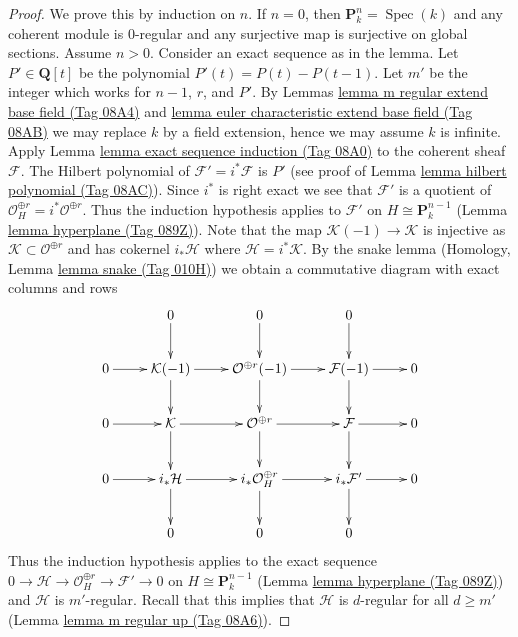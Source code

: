 \documentclass{amsart}
\theoremstyle{plain}
\theoremstyle{definition}
\theoremstyle{remark}
\numberwithin{equation}{subsection}
\def\Spec{\mathop{\mathrm{Spec}}}
\begin{document}
\begin{proof}
We prove this by induction on $n$. If $n = 0$, then
$\mathbf{P}^n_k = \Spec(k)$ and any coherent module is $0$-regular
and any surjective map is surjective on global sections.
Assume $n > 0$. Consider an exact sequence as in the lemma.
Let $P' \in \mathbf{Q}[t]$ be the polynomial
$P'(t) = P(t) - P(t - 1)$. Let $m'$ be the integer
which works for $n - 1$, $r$, and $P'$.
By Lemmas \href{https://stacks.math.columbia.edu/tag/08A4}{lemma m regular extend base field (Tag 08A4)} and
\href{https://stacks.math.columbia.edu/tag/08AB}{lemma euler characteristic extend base field (Tag 08AB)}
we may replace $k$ by a field extension, hence we may assume
$k$ is infinite. Apply 
Lemma \href{https://stacks.math.columbia.edu/tag/08A0}{lemma exact sequence induction (Tag 08A0)}
to the coherent sheaf $\mathcal{F}$.
The Hilbert polynomial of $\mathcal{F}' = i^*\mathcal{F}$
is $P'$ (see proof of Lemma \href{https://stacks.math.columbia.edu/tag/08AC}{lemma hilbert polynomial (Tag 08AC)}).
Since $i^*$ is right exact we see that $\mathcal{F}'$ is
a quotient of $\mathcal{O}_H^{\oplus r} = i^*\mathcal{O}^{\oplus r}$.
Thus the induction hypothesis applies to $\mathcal{F}'$ on
$H \cong \mathbf{P}^{n - 1}_k$ (Lemma \href{https://stacks.math.columbia.edu/tag/089Z}{lemma hyperplane (Tag 089Z)}).
Note that the map $\mathcal{K}(-1) \to \mathcal{K}$ is injective
as $\mathcal{K} \subset \mathcal{O}^{\oplus r}$ and has
cokernel $i_*\mathcal{H}$ where $\mathcal{H} = i^*\mathcal{K}$.
By the snake lemma (Homology, Lemma \href{https://stacks.math.columbia.edu/tag/010H}{lemma snake (Tag 010H)})
we obtain a commutative diagram with exact columns and rows
$$
\xymatrix{
& 0 \ar[d] & 0 \ar[d] & 0 \ar[d] \\
0 \ar[r] &
\mathcal{K}(-1) \ar[r] \ar[d] &
\mathcal{O}^{\oplus r}(-1) \ar[r] \ar[d] &
\mathcal{F}(-1) \ar[d] \ar[r] & 0 \\
0 \ar[r] &
\mathcal{K} \ar[r] \ar[d] &
\mathcal{O}^{\oplus r} \ar[r] \ar[d] &
\mathcal{F} \ar[d] \ar[r] & 0\\
0 \ar[r] &
i_*\mathcal{H} \ar[r] \ar[d] &
i_*\mathcal{O}_H^{\oplus r} \ar[r] \ar[d] &
i_*\mathcal{F}' \ar[r] \ar[d] & 0 \\
& 0 & 0 & 0
}
$$
Thus the induction hypothesis applies to the exact sequence
$0 \to \mathcal{H} \to \mathcal{O}_H^{\oplus r} \to \mathcal{F}' \to 0$
on $H \cong \mathbf{P}^{n - 1}_k$ (Lemma \href{https://stacks.math.columbia.edu/tag/089Z}{lemma hyperplane (Tag 089Z)})
and $\mathcal{H}$ is $m'$-regular. Recall that this implies that
$\mathcal{H}$ is $d$-regular for all $d \geq m'$
(Lemma \href{https://stacks.math.columbia.edu/tag/08A6}{lemma m regular up (Tag 08A6)}).


\end{proof}
\end{document}
